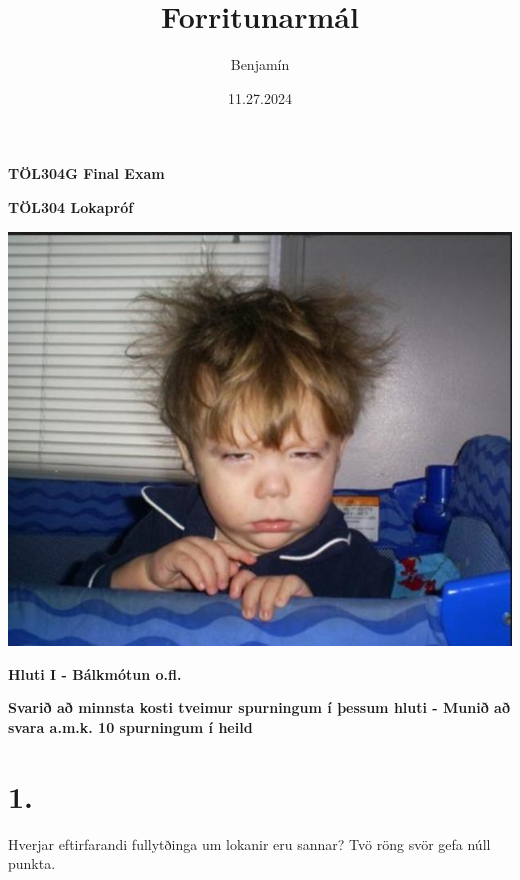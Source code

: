 \documentclass{article}
\title{Forritunarmál}
\author{Benjamín}
\date{11.27.2024}
\begin{document}
\maketitle
\begin{center}

\Huge{\textbf{TÖL304G Final Exam}}


\LARGE{\textbf{TÖL304 Lokapróf}}

\vspace{5em}

\includegraphics[scale = 0.5]{myndir/bugun.jpg}
\end{center}


\newpage


\begin{center}
    \textbf{Hluti I - Bálkmótun o.fl.}

    \textbf{Svarið að minnsta kosti tveimur spurningum í þessum hluti - Munið að svara a.m.k. 10 spurningum í heild}
\end{center}

\section{1.}

Hverjar eftirfarandi fullytðinga um lokanir eru sannar? Tvö röng svör gefa núll punkta.
\end{document}
